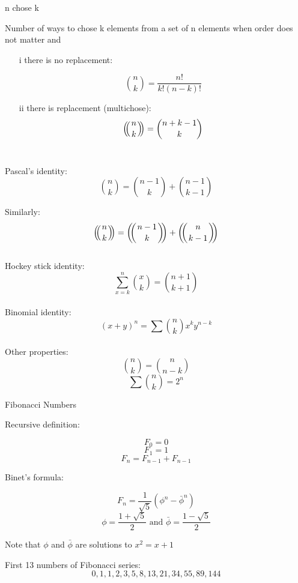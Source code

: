 \documentclass[12pt]{article}
\def\multiset#1#2{\ensuremath{\left(\kern-.3em\left(\genfrac{}{}{0pt}{}{#1}{#2}\right)\kern-.3em\right)}}
\begin{document}
\begin{center} n chose k \end{center}

\noindent Number of ways to chose k elements from a set of n elements when order does not matter and\\

\begin{itemize}
\item[i] there is no replacement:

\[ \binom{n}{k} = \frac{n!}{k!(n-k)!} \]

\item[ii] there is replacement (multichose):
\[\multiset{n}{k} = \binom{n+k-1}{k}\]\\
\end{itemize}

\noindent Pascal's identity:
\[\binom{n}{k} = \binom{n-1}{k}  + \binom{n-1}{k-1} \]

\noindent Similarly:
\[\multiset{n}{k} = \multiset{n-1}{k} + \multiset{n}{k-1}\]\\

\noindent Hockey stick identity:
\[\sum_{x=k}^n{\binom{x}{k}} = \binom{n+1}{k+1}\]\\

\noindent Binomial identity:
\[(x+y)^n = \sum{\binom{n}{k} x^k y^{n-k}} \]\\

\noindent Other properties:
\[\binom{n}{k} = \binom{n}{n-k} \]
\[\sum{\binom{n}{k}} = 2^n\]

\pagebreak

\begin{center} Fibonacci Numbers \end{center}

\noindent Recursive definition:

\[F_0 = 0\]
\[F_1 = 1\]
\[F_n = F_{n-1} + F_{n-1} \]

\noindent Binet's formula:

\[F_n = \frac 1{\sqrt{5}} (\phi^n - \bar{\phi}^n)\]
\[\phi = \frac{1+\sqrt{5}}2 \text{ and } \bar{\phi} = \frac{1-\sqrt{5}}2\]

\begin{center}  Note that $\phi$ and $\bar{\phi}$ are solutions to $x^2 = x + 1$ \end{center}

\noindent First 13 numbers of Fibonacci series:
\[0, 1, 1, 2, 3, 5, 8, 13, 21, 34, 55, 89, 144\]\\
\end{document}
